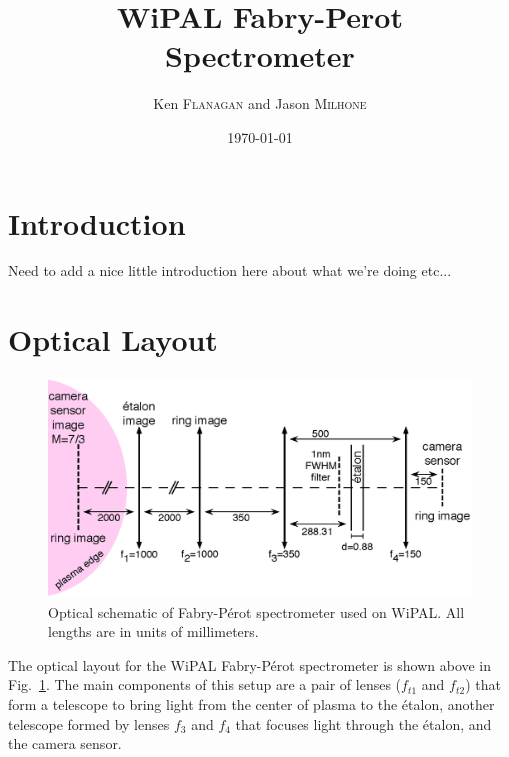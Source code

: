 \documentclass{article}
\title{WiPAL Fabry-Perot\\ Spectrometer} %
\author{Ken \textsc{Flanagan} and Jason \textsc{Milhone}} %
\date{\today} %
\begin{document}
\maketitle %




\section{Introduction}
Need to add a nice little introduction here about what we're doing etc...


\section{Optical Layout}
\begin{figure}
\includegraphics[width=\textwidth]{Images/FP_Optical_Schematic.eps}
\caption{Optical schematic of Fabry-P\'{e}rot spectrometer used on WiPAL. All lengths are in units of millimeters. \label{fig:opticalsetup}}
\end{figure}
The optical layout for the WiPAL Fabry-P\'{e}rot spectrometer is shown above in Fig.~\ref{fig:opticalsetup}. The main components of this setup are a pair of lenses ($f_{t1}$ and $f_{t2}$) that form a telescope to bring light from the center of plasma to the \'{e}talon, another telescope formed by lenses $f_{3}$ and $f_{4}$ that focuses light through the \'{e}talon, and the camera sensor. 
\end{document}

